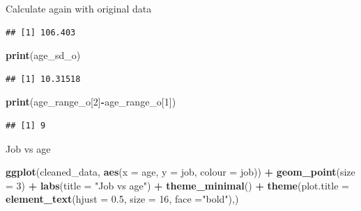 \documentclass[
]{article}
\newenvironment{Shaded}{\begin{snugshade}}{\end{snugshade}}
\newcommand{\AttributeTok}[1]{\textcolor[rgb]{0.13,0.29,0.53}{#1}}
\newcommand{\DecValTok}[1]{\textcolor[rgb]{0.00,0.00,0.81}{#1}}
\newcommand{\FloatTok}[1]{\textcolor[rgb]{0.00,0.00,0.81}{#1}}
\newcommand{\FunctionTok}[1]{\textcolor[rgb]{0.13,0.29,0.53}{\textbf{#1}}}
\newcommand{\NormalTok}[1]{#1}
\newcommand{\OtherTok}[1]{\textcolor[rgb]{0.56,0.35,0.01}{#1}}
\newcommand{\SpecialCharTok}[1]{\textcolor[rgb]{0.81,0.36,0.00}{\textbf{#1}}}
\newcommand{\StringTok}[1]{\textcolor[rgb]{0.31,0.60,0.02}{#1}}
\begin{document}
Calculate again with original data

\begin{Shaded}
\end{Shaded}

\begin{verbatim}
## [1] 106.403
\end{verbatim}

\begin{Shaded}
\begin{Highlighting}[]
\FunctionTok{print}\NormalTok{(age\_sd\_o)}
\end{Highlighting}
\end{Shaded}

\begin{verbatim}
## [1] 10.31518
\end{verbatim}

\begin{Shaded}
\begin{Highlighting}[]
\FunctionTok{print}\NormalTok{(age\_range\_o[}\DecValTok{2}\NormalTok{]}\SpecialCharTok{{-}}\NormalTok{age\_range\_o[}\DecValTok{1}\NormalTok{])}
\end{Highlighting}
\end{Shaded}

\begin{verbatim}
## [1] 9
\end{verbatim}

Job vs age

\begin{Shaded}
\begin{Highlighting}[]
\FunctionTok{ggplot}\NormalTok{(cleaned\_data, }\FunctionTok{aes}\NormalTok{(}\AttributeTok{x =}\NormalTok{ age, }\AttributeTok{y =}\NormalTok{ job, }\AttributeTok{colour =}\NormalTok{ job)) }\SpecialCharTok{+} \FunctionTok{geom\_point}\NormalTok{(}\AttributeTok{size =} \DecValTok{3}\NormalTok{)  }\SpecialCharTok{+}  \FunctionTok{labs}\NormalTok{(}\AttributeTok{title =} \StringTok{"Job vs age"}\NormalTok{) }\SpecialCharTok{+} \FunctionTok{theme\_minimal}\NormalTok{() }\SpecialCharTok{+} \FunctionTok{theme}\NormalTok{(}\AttributeTok{plot.title =} \FunctionTok{element\_text}\NormalTok{(}\AttributeTok{hjust =} \FloatTok{0.5}\NormalTok{, }\AttributeTok{size =} \DecValTok{16}\NormalTok{, }\AttributeTok{face =}\StringTok{"bold"}\NormalTok{),)}
\end{Highlighting}
\end{Shaded}
\end{document}
